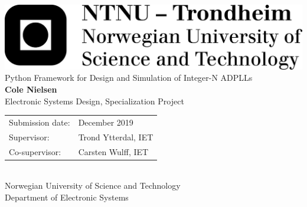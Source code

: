 	\thispagestyle{firstpage}
	\fontfamily{\sfdefault}\selectfont 
	\includegraphics[width=0.5\linewidth]{logo_ntnu_eng_black.png} \\
	\vspace{8em}
	\huge Python Framework for Design and Simulation of Integer-N ADPLLs\\	
	\vspace{3em}
	\huge \textbf{Cole Nielsen}\\
	\vspace{14em}
	\large
	Electronic Systems Design, Specialization Project\\
	\vspace{4pt}
	\FloatBarrier

	\def\arraystretch{1.3}
	\setlength{\tabcolsep}{1em}
	\begin{tabular}{@{} l  l}
	Submission date: & December 2019\\
	Supervisor: & Trond Ytterdal, IET\\
	Co-supervisor: & Carsten Wulff, IET\\
	\end{tabular} \\
	\FloatBarrier
	\vspace{3em}
	Norwegian University of Science and Technology \\ 
	\vspace{4pt}Department of Electronic Systems\\
	

